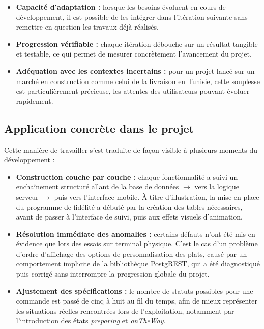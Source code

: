 \documentclass[12pt,fleqn,a4paper]{report}
\begin{document}
\begin{justify}
\begin{itemize}
    \item \textbf{Capacité d'adaptation :} lorsque les besoins évoluent en cours de
    développement, il est possible de les intégrer dans l'itération suivante sans
    remettre en question les travaux déjà réalisés.

    \item \textbf{Progression vérifiable :} chaque itération débouche sur un résultat
    tangible et testable, ce qui permet de mesurer concrètement l'avancement du projet.

    \item \textbf{Adéquation avec les contextes incertains :} pour un projet lancé sur
    un marché en construction comme celui de la livraison en Tunisie, cette souplesse
    est particulièrement précieuse, les attentes des utilisateurs pouvant évoluer
    rapidement.
\end{itemize}

\subsection{Application concrète dans le projet}

Cette manière de travailler s'est traduite de façon visible à plusieurs moments du
développement :

\begin{itemize}
    \item \textbf{Construction couche par couche :} chaque fonctionnalité a suivi un
    enchaînement structuré allant de la base de données $\rightarrow$ vers la logique
    serveur $\rightarrow$ puis vers l'interface mobile. À titre d'illustration, la
    mise en place du programme de fidélité a débuté par la création des tables
    nécessaires, avant de passer à l'interface de suivi, puis aux effets visuels
    d'animation.

    \item \textbf{Résolution immédiate des anomalies :} certains défauts n'ont été
    mis en évidence que lors des essais sur terminal physique. C'est le cas d'un
    problème d'ordre d'affichage des options de personnalisation des plats, causé
    par un comportement implicite de la bibliothèque PostgREST, qui a été diagnostiqué
    puis corrigé sans interrompre la progression globale du projet.

    \item \textbf{Ajustement des spécifications :} le nombre de statuts possibles
    pour une commande est passé de cinq à huit au fil du temps, afin de mieux
    représenter les situations réelles rencontrées lors de l'exploitation, notamment
    par l'introduction des états \textit{preparing} et \textit{onTheWay}.


\end{itemize}
\end{justify}
\end{document}
